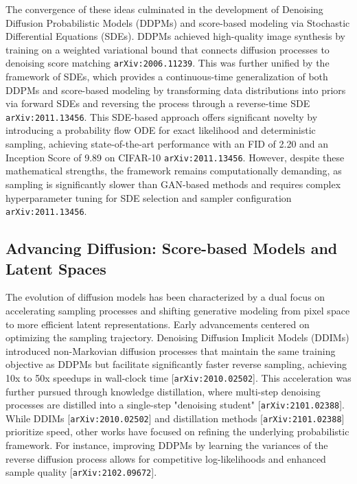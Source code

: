 \documentclass[11pt]{article}
\begin{document}
The convergence of these ideas culminated in the development of Denoising Diffusion Probabilistic Models (DDPMs) and score-based modeling via Stochastic Differential Equations (SDEs). DDPMs achieved high-quality image synthesis by training on a weighted variational bound that connects diffusion processes to denoising score matching \texttt{arXiv:2006.11239}. This was further unified by the framework of SDEs, which provides a continuous-time generalization of both DDPMs and score-based modeling by transforming data distributions into priors via forward SDEs and reversing the process through a reverse-time SDE \texttt{arXiv:2011.13456}. This SDE-based approach offers significant novelty by introducing a probability flow ODE for exact likelihood and deterministic sampling, achieving state-of-the-art performance with an FID of 2.20 and an Inception Score of 9.89 on CIFAR-10 \texttt{arXiv:2011.13456}. However, despite these mathematical strengths, the framework remains computationally demanding, as sampling is significantly slower than GAN-based methods and requires complex hyperparameter tuning for SDE selection and sampler configuration \texttt{arXiv:2011.13456}.

\subsection{Advancing Diffusion: Score-based Models and Latent Spaces}

The evolution of diffusion models has been characterized by a dual focus on accelerating sampling processes and shifting generative modeling from pixel space to more efficient latent representations. Early advancements centered on optimizing the sampling trajectory. Denoising Diffusion Implicit Models (DDIMs) introduced non-Markovian diffusion processes that maintain the same training objective as DDPMs but facilitate significantly faster reverse sampling, achieving 10x to 50x speedups in wall-clock time [\texttt{arXiv:2010.02502}]. This acceleration was further pursued through knowledge distillation, where multi-step denoising processes are distilled into a single-step "denoising student" [\texttt{arXiv:2101.02388}]. While DDIMs [\texttt{arXiv:2010.02502}] and distillation methods [\texttt{arXiv:2101.02388}] prioritize speed, other works have focused on refining the underlying probabilistic framework. For instance, improving DDPMs by learning the variances of the reverse diffusion process allows for competitive log-likelihoods and enhanced sample quality [\texttt{arXiv:2102.09672}].
\end{document}
